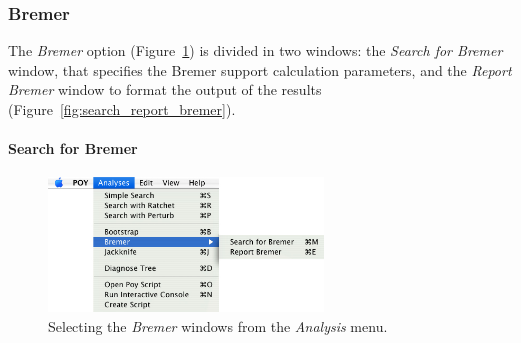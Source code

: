 \subsubsection{Bremer}

The \emph{Bremer} option (Figure~\ref{fig:search_for_bermer_menu}) is divided in two windows: the \emph{Search for Bremer} window, that specifies the Bremer support calculation parameters, and the \emph{Report Bremer} window to format the output of the results (Figure~\ref{fig:search_report_bremer}). 

\paragraph{Search for Bremer}

\begin{figure}[htpb]
    \begin{center}
        \includegraphics[width=0.65\textwidth]{figures/SearchForBremer_Menu.jpg}
    \end{center}
    \caption{ Selecting the \emph{Bremer} windows from the \emph{Analysis} menu.}
    \label{fig:search_for_bermer_menu}
\end{figure}

